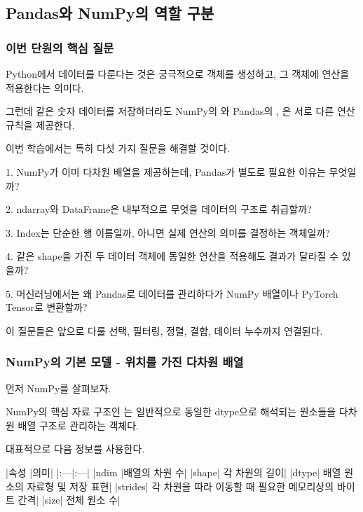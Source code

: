 

\subsection{Pandas와 NumPy의 역할 구분}

\subsubsection{이번 단원의 핵심 질문}

Python에서 데이터를 다룬다는 것은 궁극적으로 객체를 생성하고, 그 객체에 연산을 적용한다는 의미다.

그런데 같은 숫자 데이터를 저장하더라도 NumPy의 와 Pandas의 , 은 서로 다른 연산 규칙을 제공한다.

이번 학습에서는 특히 다섯 가지 질문을 해결할 것이다.

\begin{dhksmry}
1. NumPy가 이미 다차원 배열을 제공하는데, Pandas가 별도로 필요한 이유는
   무엇일까?

2. ndarray와 DataFrame은 내부적으로 무엇을 데이터의 구조로 취급할까?

3. Index는 단순한 행 이름일까, 아니면 실제 연산의 의미를 결정하는 객체일까?

4. 같은 shape을 가진 두 데이터 객체에 동일한 연산을 적용해도 결과가 달라질
   수 있을까?

5. 머신러닝에서는 왜 Pandas로 데이터를 관리하다가 NumPy 배열이나 PyTorch
   Tensor로 변환할까?
\end{dhksmry}

이 질문들은 앞으로 다룰 선택, 필터링, 정렬, 결합, 데이터 누수까지 연결된다.

\subsubsection{NumPy의 기본 모델 - 위치를 가진 다차원 배열}

먼저 NumPy를 살펴보자.

NumPy의 핵심 자료 구조인 는 일반적으로 동일한 dtype으로 해석되는 원소들을 다차원 배열 구조로 관리하는 객체다.

대표적으로 다음 정보를 사용한다.

\begin{dhktable}
|속성	|의미|
|:---|:---|
|ndim	|배열의 차원 수|
|shape|	각 차원의 길이|
|dtype|	배열 원소의 자료형 및 저장 표현|
|strides|	각 차원을 따라 이동할 때 필요한 메모리상의 바이트 간격|
|size|	전체 원소 수|
\end{dhktable}

